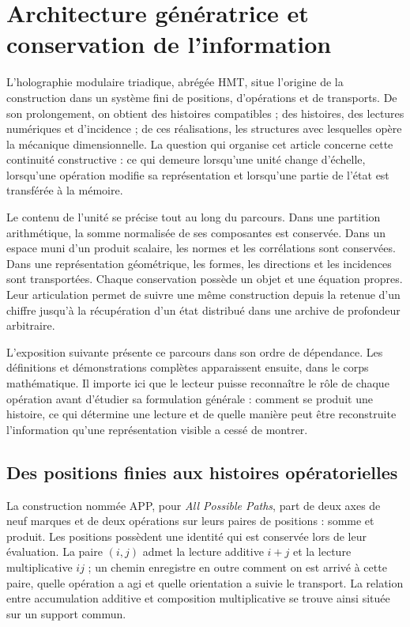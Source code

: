 \section*{Architecture génératrice et conservation de l'information}
\label{libnar:troncal}

L'holographie modulaire triadique, abrégée HMT, situe l'origine de la construction dans un système fini de positions, d'opérations et de transports. De son prolongement, on obtient des histoires compatibles ; des histoires, des lectures numériques et d'incidence ; de ces réalisations, les structures avec lesquelles opère la mécanique dimensionnelle. La question qui organise cet article concerne cette continuité constructive : ce qui demeure lorsqu'une unité change d'échelle, lorsqu'une opération modifie sa représentation et lorsqu'une partie de l'état est transférée à la mémoire.

Le contenu de l’unité se précise tout au long du parcours. Dans une
partition arithmétique, la somme normalisée de ses composantes est conservée.
Dans un espace muni d’un produit scalaire, les normes et les corrélations sont conservées.
Dans une représentation géométrique, les formes, les directions et les
incidences sont transportées. Chaque conservation possède un objet et une équation propres.
Leur articulation permet de suivre une même construction depuis la retenue
d’un chiffre jusqu’à la récupération d’un état distribué dans une archive
de profondeur arbitraire.

L’exposition suivante présente ce parcours dans son ordre de dépendance.
Les définitions et démonstrations complètes apparaissent ensuite, dans le
corps mathématique. Il importe ici que le lecteur puisse reconnaître le rôle
de chaque opération avant d’étudier sa formulation générale : comment se
produit une histoire, ce qui détermine une lecture et de quelle manière peut
être reconstruite l’information qu’une représentation visible a cessé
de montrer.

\subsection*{Des positions finies aux histoires opératorielles}
\label{libnar:app}

La construction nommée APP, pour \emph{All Possible Paths}, part de deux axes de neuf marques et de deux opérations sur leurs paires de positions : somme et produit. Les positions possèdent une identité qui est conservée lors de leur évaluation. La paire \((i,j)\) admet la lecture additive \(i+j\) et la lecture multiplicative \(ij\) ; un chemin enregistre en outre comment on est arrivé à cette paire, quelle opération a agi et quelle orientation a suivie le transport. La relation entre accumulation additive et composition multiplicative se trouve ainsi située sur un support commun.

